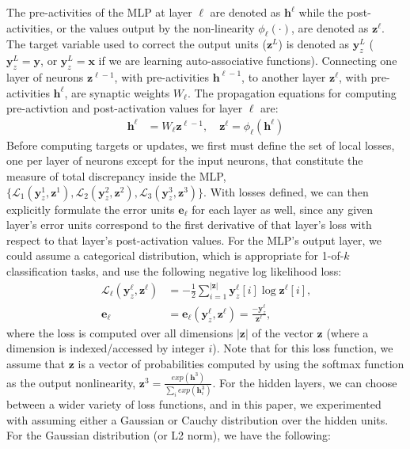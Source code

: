 \documentclass[letterpaper]{article} %
\begin{document}
The pre-activities of the MLP at layer $\ell$ are denoted as $\mathbf{h}^\ell$ while the post-activities, or the values output by the non-linearity $\phi_\ell(\cdot)$, are denoted as $\mathbf{z}^\ell$. The target variable used to correct the output units ($\mathbf{z}^L$) is denoted as $\mathbf{y}^L_z$ ($\mathbf{y}^L_z = \mathbf{y}$, or $\mathbf{y}^L_z = \mathbf{x}$ if we are learning auto-associative functions). Connecting one layer of neurons $\mathbf{z}^{\ell-1}$, with pre-activities $\mathbf{h}^{\ell-1}$, to another layer $\mathbf{z}^{\ell}$, with pre-activities $\mathbf{h}^{\ell}$, are synaptic weights $W_\ell$. The  propagation equations for computing pre-activtion and post-activation values for layer $\ell$ are:
\begin{align}
\mathbf{h}^\ell &= W_\ell \mathbf{z}^{\ell-1}, \quad \mathbf{z}^\ell = \phi_\ell(\mathbf{h}^\ell) \label{eqn:fprop}
\end{align}
Before computing targets or updates, we first must define the set of local losses, one per layer of neurons except for the input neurons, that constitute the measure of total discrepancy inside the MLP, $\{ \mathcal{L}_1(\mathbf{y}^1_z,\mathbf{z}^1), \mathcal{L}_2(\mathbf{y}^2_z,\mathbf{z}^2), \mathcal{L}_3(\mathbf{y}^3_z,\mathbf{z}^3) \}$. With losses defined, we can then explicitly formulate the error units $\mathbf{e}_\ell$ for each layer as well, since any given layer's error units correspond to the first derivative of that layer's loss with respect to that layer's post-activation values. For the MLP's output layer, we could assume a categorical distribution, which is appropriate for 1-of-$k$ classification tasks, and use the following negative log likelihood loss:
\begin{align}
\mathcal{L}_\ell(\mathbf{y}^\ell_z, \mathbf{z}^\ell) &= -\frac{1}{2} \sum^{|\mathbf{z}|}_{i=1} \mathbf{y}^\ell_z[i] \log \mathbf{z}^\ell[i]  \mbox{,} \nonumber \\  
\mathbf{e}_\ell &= \mathbf{e}_\ell(\mathbf{y}^\ell_z, \mathbf{z}^\ell) = \frac{-\mathbf{y}^\ell_z}{\mathbf{z}^\ell} \mbox{,} \label{cat_loss}
\end{align}
where the loss is computed over all dimensions $|\mathbf{z}|$ of the vector $\mathbf{z}$ (where a dimension is indexed/accessed by integer $i$). Note that for this loss function, we assume that $\mathbf{z}$ is a vector of probabilities computed by using the softmax function as the output nonlinearity, $\mathbf{z}^3 = \frac{exp(\mathbf{h}^3)}{\sum_i exp(\mathbf{h}^3_i)}$. For the hidden layers, we can choose between a wider variety of loss functions, and in this paper, we experimented with assuming either a Gaussian or Cauchy distribution over the hidden units. For the Gaussian distribution (or L2 norm), we have the following:
\end{document}
